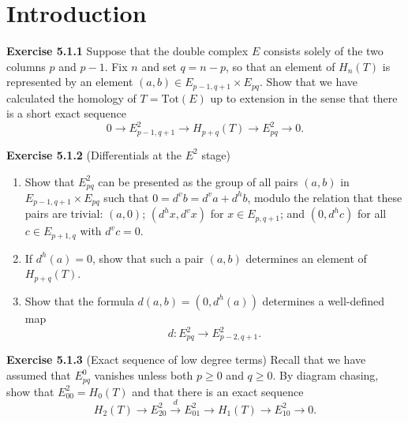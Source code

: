 \section{Introduction}
\textbf{Exercise 5.1.1} Suppose that the double complex $E$ consists solely of the two columns $p$ and $p-1$. Fix $n$ and set $q = n - p$, so that an element of $H_n(T)$ is represented by an element $(a, b) \in E_{p-1,q+1} \times E_{pq}$. Show that we have calculated the homology of $T = \text{Tot}(E)$ up to extension in the sense that there is a short exact sequence
\[
0 \to E^2_{p-1,q+1} \to H_{p+q}(T) \to E^2_{pq} \to 0.
\]

\textbf{Exercise 5.1.2} (Differentials at the $E^2$ stage)
\begin{enumerate}
    \item Show that $E^2_{pq}$ can be presented as the group of all pairs $(a, b)$ in $E_{p-1,q+1} \times E_{pq}$ such that $0 = d^v b = d^v a + d^h b$, modulo the relation that these pairs are trivial: $(a, 0)$; $(d^h x, d^v x)$ for $x \in E_{p,q+1}$; and $(0, d^h c)$ for all $c \in E_{p+1,q}$ with $d^v c = 0$.
    \item If $d^h(a) = 0$, show that such a pair $(a, b)$ determines an element of $H_{p+q}(T)$.
    \item Show that the formula $d(a, b) = (0, d^h(a))$ determines a well-defined map
    \[
    d: E^2_{pq} \to E^2_{p-2,q+1}.
    \]
\end{enumerate}

\textbf{Exercise 5.1.3} (Exact sequence of low degree terms) Recall that we have assumed that $E^0_{pq}$ vanishes unless both $p \geq 0$ and $q \geq 0$. By diagram chasing, show that $E^2_{00} = H_0(T)$ and that there is an exact sequence
\[
H_2(T) \to E^2_{20} \xrightarrow{d} E^2_{01} \to H_1(T) \to E^2_{10} \to 0.
\]







\newpage